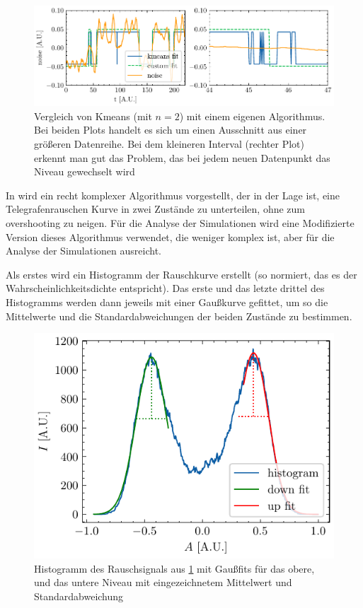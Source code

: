 \documentclass[main.tex]{subfiles}
\begin{document}
\begin{figure}[h]
    \centering
    \includegraphics{bilder/plots/theo-vis/telegraph_fit_comp.pdf}
    \caption{Vergleich von Kmeans (mit \(n=2\)) mit einem eigenen Algorithmus. Bei beiden Plots handelt es sich um einen Ausschnitt aus einer größeren Datenreihe. Bei dem kleineren Interval (rechter Plot) erkennt man gut das Problem, das bei jedem neuen Datenpunkt das Niveau gewechselt wird}\label{fig:fit_comp}
\end{figure}

In \cite{random-telegraph-analysis} wird ein recht komplexer Algorithmus vorgestellt, der in der Lage ist, eine Telegrafenrauschen Kurve in zwei Zustände zu unterteilen, ohne zum overshooting zu neigen. Für die Analyse der Simulationen wird eine Modifizierte Version dieses Algorithmus verwendet, die weniger komplex ist, aber für die Analyse der Simulationen ausreicht.


Als erstes wird ein Histogramm der Rauschkurve erstellt (so normiert, das es der Wahrscheinlichkeitsdichte entspricht). 
Das erste und das letzte drittel des Histogramms werden dann jeweils mit einer Gaußkurve gefittet, um so die Mittelwerte und die Standardabweichungen der beiden Zustände zu bestimmen.

\begin{figure}[h]
    \centering
    \includegraphics{bilder/plots/theo-vis/hist_fit.pdf}
    \caption{Histogramm des Rauschsignals aus \cref{fig:fit_comp} mit Gaußfits für das obere, und das untere Niveau mit eingezeichnetem Mittelwert und Standardabweichung}
\end{figure}
\end{document}
